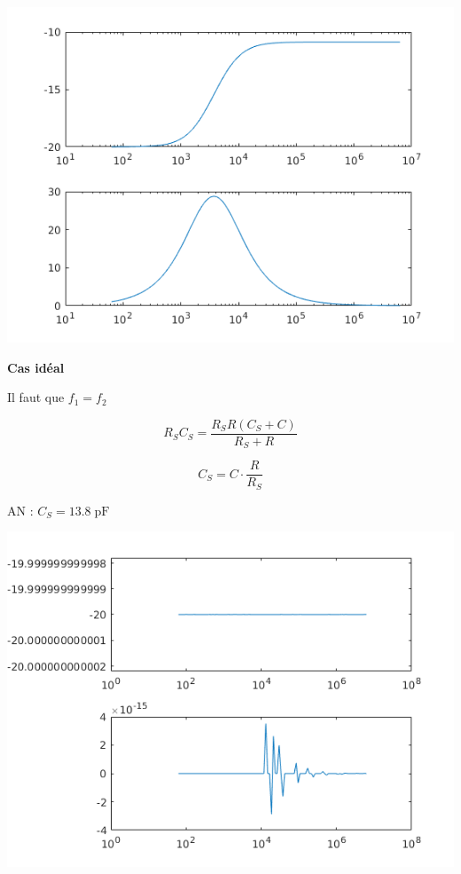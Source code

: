 \documentclass[a4paper,french]{paper}
\begin{document}
\begin{center}
	\includegraphics{images/TD/TD5_ex2_cs50pf.png}
\end{center}

\qquad

\textbf{\large Cas idéal}

Il faut que $f_1 = f_2$

$$R_S C_S = \frac{R_S R (C_S + C)}{R_S + R}$$

$$C_S = C \cdot \frac{R}{R_S}$$

AN : $C_S = 13.8 \operatorname{pF}$

\begin{center}
	\includegraphics{images/TD/TD5_ex2_cscomp.png}
\end{center}
\end{document}
